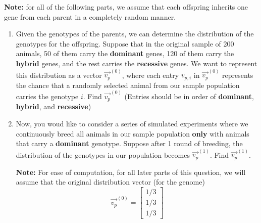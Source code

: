 \textbf{Note: } for all of the following parts, we assume that each offspring inherits one gene from each parent in a completely random manner. 
\begin{enumerate}
    \item Given the genotypes of the parents, we can determine the distribution of the genotypes for the offspring. Suppose that in the original sample of 200 animals, 50 of them carry the \textbf{dominant} genes, 120 of them carry the \textbf{hybrid} genes, and the rest carries the \textbf{recessive} genes. We want to represent this distribution as a vector $\vec{v_p}^{(0)}$, where each entry $v_{p, i}$ in $\vec{v_p}^{(0)}$ represents the chance that a randomly selected animal from our sample population carries the genotype $i$. Find $\vec{v_p}^{(0)}$ (Entries should be in order of \textbf{dominant}, \textbf{hybrid}, and \textbf{recessive})
    
    

    \item Now, you woud like to consider a series of simulated experiments where we continuously breed all animals in our sample population \textbf{only} with animals that carry a \textbf{dominant} genotype. Suppose after 1 round of breeding, the distribution of the genotypes in our population becomes $\vec{v_p}^{(1)}$. Find $\vec{v_p}^{(1)}$. 
    
    \textbf{Note: } For ease of computation, for all later parts of this question, we will assume that the original distribution vector (for the genome) $$\vec{v_p}^{(0)} = \begin{bmatrix}
1/3\\ 
1/3\\
1/3 
\end{bmatrix}$$


\end{enumerate}
